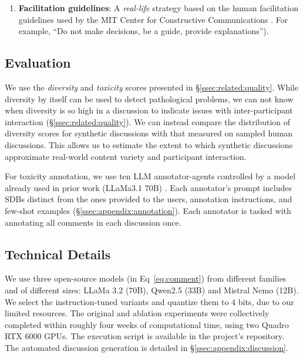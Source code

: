 \begin{enumerate}
    \item \textbf{Facilitation guidelines}: A \emph{real-life} strategy based on the human facilitation guidelines used by the MIT Center for Constructive Communications \cite{dimitra-book}. For example, “Do not make decisions, be a guide, provide explanations”). %
\end{enumerate}


\subsection{Evaluation}
\label{ssec:experimental:evaluation}

 We use the \emph{diversity} and \emph{toxicity} scores presented in \S\ref{ssec:related:quality}. While diversity by itself can be used to detect pathological problems, we can not know when diversity is so high in a discussion to indicate issues with inter-participant interaction (\S\ref{ssec:related:quality}). We can instead compare the distribution of diversity scores for synthetic discussions with that measured on sampled human discussions. This allows us to estimate the extent to which synthetic discussions approximate real-world content variety and participant interaction.
 
 For toxicity annotation, we use ten \ac{LLM} annotator-agents controlled by a model already used in prior work (LLaMa3.1 70B) \cite{kang-qian-2024-implanting}. Each annotator's prompt includes \acp{SDB} distinct from the ones provided to the users, annotation instructions, and few-shot examples (\S\ref{ssec:appendix:annotation}). Each annotator is tasked with annotating all comments in each discussion once.

\subsection{Technical Details}
\label{ssec:experimental:setup}

We use three open-source models (in Eq~\ref{eq:comment}) from different families and of different sizes: LLaMa 3.2 (70B), Qwen2.5 (33B) and Mistral Nemo (12B). We select the instruction-tuned variants and quantize them to 4 bits, due to our limited resources. The original and ablation experiments were collectively completed within roughly four weeks of computational time, using two Quadro RTX 6000 GPUs. The execution script is available in the project's repository\analysislink. The automated discussion generation is detailed in \S\ref{ssec:appendix:discussion}.